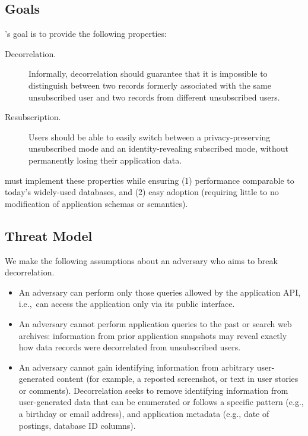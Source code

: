 \subsection{Goals} 
\sys's goal is to provide the following properties:
\begin{description} 
    \item[Decorrelation.] Informally, decorrelation should guarantee that it is impossible to distinguish
        between two records formerly associated with the same unsubscribed user and two records from
        different unsubscribed users.  
    \item[Resubscription.] Users should be able to easily switch between a privacy-preserving unsubscribed mode 
       and an identity-revealing subscribed mode, without permanently losing their application data.  
\end{description}

\sys{} must implement these properties while ensuring (1) performance comparable to today’s
widely-used databases, and (2) easy adoption (requiring little to no modification of application
schemas or semantics).

\subsection{Threat Model} 
We make the following assumptions about an adversary who aims to break decorrelation.
\begin{itemize}
    \item An adversary can perform only those queries allowed by the application API, 
i.e.,\ can access the application only via its public interface. 

    \item An adversary cannot perform application queries to the past or search web archives:
    information from prior application snapshots may reveal 
    exactly how data records were decorrelated from unsubscribed users. 

    \item An adversary cannot gain identifying information from arbitrary user-generated content (for
        example, a reposted screenshot, or text in user stories or comments). Decorrelation seeks to
        remove identifying information from user-generated data that can be enumerated or follows a
        specific pattern (e.g., a birthday or email address), and application metadata (e.g., date
        of postings, database ID columns).
\end{itemize}

